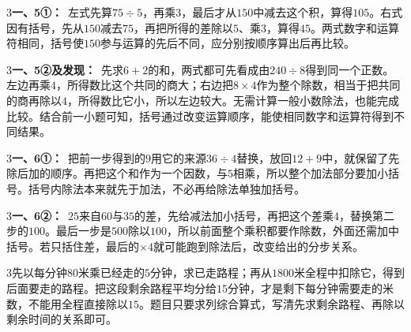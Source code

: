 \documentclass[multi=snippet,border={5bp 20bp 5bp 5bp}]{standalone}
\newenvironment{snippet}[3]{\begin{minipage}{#1bp}\color{answerred}\fontsize{#2}{#3}\selectfont\raggedright}{\end{minipage}}
\begin{document}
\begin{snippet}{505}{11.5}{14}\begin{multicols}{3}\raggedcolumns \textbf{一、5①：}\ 左式先算\(75\div5\)\allowbreak ，再乘\(3\)\allowbreak ，最后才从\(150\)\allowbreak 中减去这个积，算得\(105\)\allowbreak 。右式因有括号，先从\(150\)\allowbreak 减去\(75\)\allowbreak ，再把所得的差除以\(5\)\allowbreak 、乘\(3\)\allowbreak ，算得\(45\)\allowbreak 。两式数字和运算符相同，括号使\(150\)\allowbreak 参与运算的先后不同，应分别按顺序算出后再比较。\end{multicols}\end{snippet}
\begin{snippet}{505}{11.5}{14}\begin{multicols}{3}\raggedcolumns \textbf{一、5②及发现：}\ 先求\(6+2\)\allowbreak 的和，两式都可先看成由\(240\div8\)\allowbreak 得到同一个正数。左边再乘\(4\)\allowbreak ，所得数比这个共同的商大；右边把\(8\times4\)\allowbreak 作为整个除数，相当于把共同的商再除以\(4\)\allowbreak ，所得数比它小，所以左边较大。无需计算一般小数除法，也能完成比较。结合前一小题可知，括号通过改变运算顺序，能使相同数字和运算符得到不同结果。\end{multicols}\end{snippet}
\begin{snippet}{505}{11.5}{14}\begin{multicols}{3}\raggedcolumns \textbf{一、6①：}\ 把前一步得到的\(9\)\allowbreak 用它的来源\(36\div4\)\allowbreak 替换，放回\(12+9\)\allowbreak 中，就保留了先除后加的顺序。再把这个和作为一个因数，与\(5\)\allowbreak 相乘，所以整个加法部分要加小括号。括号内除法本来就先于加法，不必再给除法单独加括号。\end{multicols}\end{snippet}
\begin{snippet}{505}{11.5}{14}\begin{multicols}{3}\raggedcolumns \textbf{一、6②：}\ \(25\)\allowbreak 来自\(60\)\allowbreak 与\(35\)\allowbreak 的差，先给减法加小括号，再把这个差乘\(4\)\allowbreak ，替换第二步的\(100\)\allowbreak 。最后一步是\(500\)\allowbreak 除以\(100\)\allowbreak ，所以前面整个乘积都要作除数，外面还需加中括号。若只括住差，最后的\(\times4\)\allowbreak 就可能跑到除法后，改变给出的分步关系。\end{multicols}\end{snippet}
\begin{snippet}{505}{11.5}{14}\begin{multicols}{3}\raggedcolumns 先以每分钟\(80\)\allowbreak 米乘已经走的\(5\)\allowbreak 分钟，求已走路程；再从\(1800\)\allowbreak 米全程中扣除它，得到后面要走的路程。把这段剩余路程平均分给\(15\)\allowbreak 分钟，才是剩下每分钟需要走的米数，不能用全程直接除以\(15\)\allowbreak 。题目只要求列综合算式，写清先求剩余路程、再除以剩余时间的关系即可。\end{multicols}\end{snippet}
\end{document}
